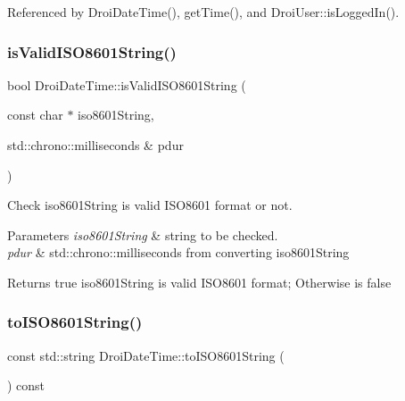Referenced by Droi\+Date\+Time(), get\+Time(), and Droi\+User\+::is\+Logged\+In().

\mbox{\label{class_droi_date_time_ac4dfd56ef368d601d228992f0902a357}} 
\subsubsection{\texorpdfstring{is\+Valid\+I\+S\+O8601\+String()}{isValidISO8601String()}\hspace{0.1cm}{\footnotesize\ttfamily [2/2]}}
{\footnotesize\ttfamily bool Droi\+Date\+Time\+::is\+Valid\+I\+S\+O8601\+String (\begin{DoxyParamCaption}\item[{const char $\ast$}]{iso8601\+String,  }\item[{std\+::chrono\+::milliseconds \&}]{pdur }\end{DoxyParamCaption})\hspace{0.3cm}{\ttfamily [static]}}

Check iso8601\+String is valid I\+S\+O8601 format or not. 
\begin{DoxyParams}{Parameters}
{\em iso8601\+String} & string to be checked. \\
\hline
{\em pdur} & std\+::chrono\+::milliseconds from converting iso8601\+String \\
\hline
\end{DoxyParams}
\begin{DoxyReturn}{Returns}
true iso8601\+String is valid I\+S\+O8601 format; Otherwise is false 
\end{DoxyReturn}
\mbox{\label{class_droi_date_time_ad4b6059b573aeaf19c488dc210282e82}} 
\subsubsection{\texorpdfstring{to\+I\+S\+O8601\+String()}{toISO8601String()}\hspace{0.1cm}{\footnotesize\ttfamily [1/3]}}
{\footnotesize\ttfamily const std\+::string Droi\+Date\+Time\+::to\+I\+S\+O8601\+String (\begin{DoxyParamCaption}{ }\end{DoxyParamCaption}) const}

